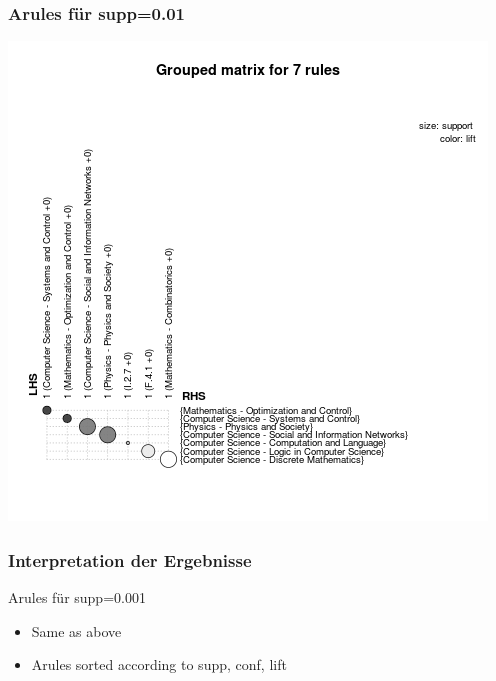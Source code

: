 \documentclass[12pt, xcolor=table]{beamer}
\begin{document}
\begin{frame}
	\frametitle{Arules für supp=0.01}
	\begin{center}
		\includegraphics[scale=0.5]{../../visual/plot_matrix_grouped_7rules.png}
	\end{center}
\end{frame}
\begin{frame}
    \frametitle{Interpretation der Ergebnisse}
    \begin{block}{Arules für supp=0.001}
        \begin{itemize}
           \item Same as above
           \item Arules sorted according to supp, conf, lift
        \end{itemize}
    \end{block}
\end{frame}
\end{document}
